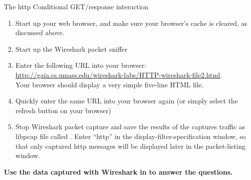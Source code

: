 \begin{exercise}{The \ac{http} Conditional GET/response interaction}
\begin{enumerate}
	\item Start up your web browser, and make sure your browser’s cache is cleared, as discussed above. 
	\item Start up the Wireshark packet sniffer 
	\item Enter the following URL into your browser:\\ \url{http://gaia.cs.umass.edu/wireshark-labs/HTTP-wireshark-file2.html}.
	\\Your browser should display a very simple five-line HTML file. 
	\item Quickly enter the same URL into your browser again (or simply select the refresh button on your browser) 
	\item Stop Wireshark packet capture and save the results of the captures traffic as libpcap file called . Enter ``http'' in the display-filter-specification window, so that only captured \ac{http} messages will be displayed later in the packet-listing window. 
\end{enumerate}

\textbf{Use the data captured with Wireshark in  to answer the questions.}

\end{exercise}

